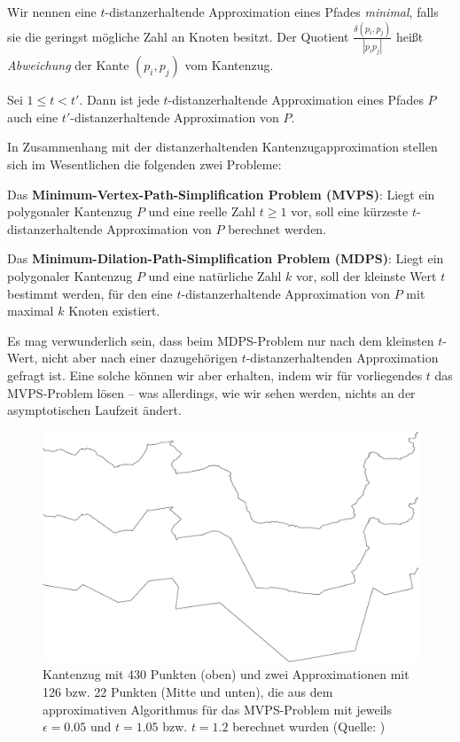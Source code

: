 	Wir nennen eine $t$-distanzerhaltende Approximation eines Pfades \emph{minimal}, falls sie die geringst mögliche Zahl an Knoten besitzt.
	Der Quotient $\frac{\delta(p_i, p_j)}{|p_ip_j|}$ heißt \emph{Abweichung} der Kante $(p_i, p_j)$ vom Kantenzug.
	\begin{corollary}
		\label{cor:approximations}
		Sei $1 \leq t < t'$. Dann ist jede $t$-distanzerhaltende Approximation eines Pfades $P$ auch eine $t'$-distanzerhaltende Approximation von $P$.
	\end{corollary}

	In Zusammenhang mit der distanzerhaltenden Kantenzugapproximation stellen sich im Wesentlichen die folgenden zwei Probleme:
	
	\noindent Das \textbf{Minimum-Vertex-Path-Simplification Problem (MVPS)}: Liegt ein polygonaler Kantenzug $P$ und eine reelle Zahl $t \geq 1$ vor, soll eine kürzeste $t$-distanzerhaltende Approximation von $P$ berechnet werden.
	
	\noindent Das \textbf{Minimum-Dilation-Path-Simplification Problem (MDPS)}: Liegt ein polygonaler Kantenzug $P$ und eine natürliche Zahl $k$ vor, soll der kleinste Wert $t$ bestimmt werden, für den eine $t$-distanzerhaltende Approximation von $P$ mit maximal $k$ Knoten existiert.
	
	Es mag verwunderlich sein, dass beim MDPS-Problem nur nach dem kleinsten $t$-Wert, nicht aber nach einer dazugehörigen $t$-distanzerhaltenden Approximation gefragt ist. Eine solche können wir aber erhalten, indem wir für vorliegendes $t$ das MVPS-Problem lösen -- was allerdings, wie wir sehen werden, nichts an der asymptotischen Laufzeit ändert.

    \begin{figure}
    	\centering
    	\begin{minipage}{.8\linewidth}
    		 \includegraphics[scale=0.15]{approximation_example}
    	\end{minipage}
    	\caption{Kantenzug mit 430 Punkten (oben) und zwei Approximationen mit 126 bzw. 22 Punkten (Mitte und unten), die aus dem approximativen Algorithmus für das MVPS-Problem mit jeweils $\epsilon = 0.05$ und $t = 1.05$ bzw. $t = 1.2$ berechnet wurden (Quelle: \cite{gudmundsson})}
    \end{figure}